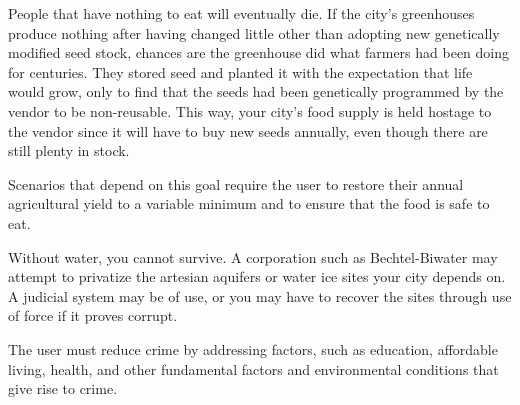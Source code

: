 
People that have nothing to eat will eventually die. If the city's greenhouses produce nothing after having changed little other than adopting new genetically modified seed stock, chances are the greenhouse did what farmers had been doing for centuries. They stored seed and planted it with the expectation that life would grow, only to find that the seeds had been genetically programmed by the vendor to be non-reusable. This way, your city's food supply is held hostage to the vendor since it will have to buy new seeds annually, even though there are still plenty in stock.

Scenarios that depend on this goal require the user to restore their annual agricultural yield to a variable minimum and to ensure that the food is safe to eat.


Without water, you cannot survive. A corporation such as Bechtel-Biwater may attempt to privatize the artesian aquifers or water ice sites your city depends on. A judicial system may be of use, or you may have to recover the sites through use of force if it proves corrupt.


The user must reduce crime by addressing factors, such as education, affordable living, health, and other fundamental factors and environmental conditions that give rise to crime.

\stopitemize

